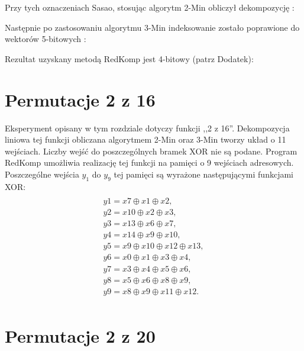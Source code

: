 


Przy tych oznaczeniach Sasao, stosując algorytm 2-Min obliczył dekompozycję \cite{sasao-s-min}:

Następnie po zastosowaniu algorytmu 3-Min indeksowanie zostało poprawione do wektorów 5-bitowych \cite{sasao-s-min}:

Rezultat uzyskany metodą RedKomp jest 4-bitowy (patrz Dodatek):

\section{Permutacje 2 z 16}

Eksperyment opisany w tym rozdziale dotyczy funkcji ,,2 z 16''.
Dekompozycja liniowa tej funkcji obliczana algorytmem 2-Min oraz 3-Min \cite{sasao-s-min} tworzy układ o 11 wejściach.
Liczby wejść do poszczególnych bramek XOR nie są podane.
Program RedKomp umożliwia realizację tej funkcji na pamięci o 9 wejściach adresowych.
Poszczególne wejścia $y_1$ do $y_9$ tej pamięci są wyrażone następującymi funkcjami XOR:
\begin{multline} \\
y1 = x7 \oplus x1 \oplus x2, \\
y2 = x10 \oplus x2 \oplus x3, \\
y3 = x13 \oplus x6 \oplus x7, \\
y4 = x14 \oplus x9 \oplus x10, \\
y5 = x9 \oplus x10 \oplus x12 \oplus x13, \\
y6 = x0 \oplus x1 \oplus x3 \oplus x4, \\
y7 = x3 \oplus x4 \oplus x5 \oplus x6, \\
y8 = x5 \oplus x6 \oplus x8 \oplus x9, \\
y9 = x8 \oplus x9 \oplus x11 \oplus x12. \\
\end{multline}

\section{Permutacje 2 z 20}


